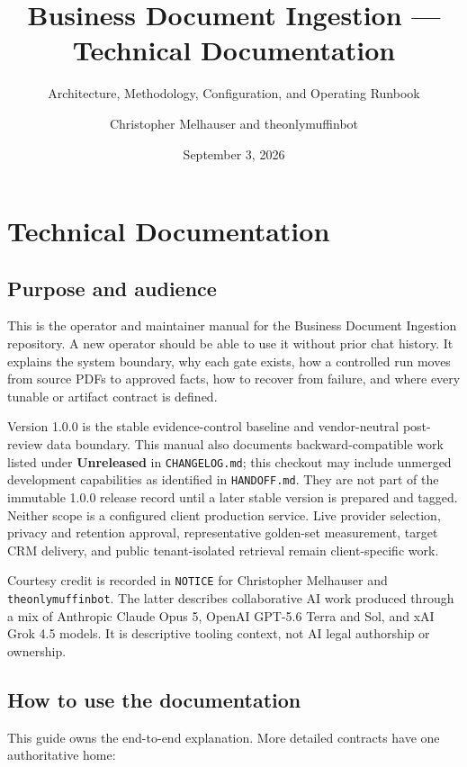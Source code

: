 \documentclass[
]{article}
\title{Business Document Ingestion --- Technical Documentation}
\subtitle{Architecture, Methodology, Configuration, and Operating
Runbook}
\author{Christopher Melhauser and theonlymuffinbot}
\date{September 3, 2026}
\begin{document}
\maketitle

\section{Technical Documentation}\label{technical-documentation}

\subsection{Purpose and audience}\label{purpose-and-audience}

This is the operator and maintainer manual for the Business Document
Ingestion repository. A new operator should be able to use it without
prior chat history. It explains the system boundary, why each gate
exists, how a controlled run moves from source PDFs to approved facts,
how to recover from failure, and where every tunable or artifact
contract is defined.

Version 1.0.0 is the stable evidence-control baseline and vendor-neutral
post-review data boundary. This manual also documents
backward-compatible work listed under \textbf{Unreleased} in
\texttt{CHANGELOG.md}; this checkout may include unmerged development
capabilities as identified in \texttt{HANDOFF.md}. They are not part of
the immutable 1.0.0 release record until a later stable version is
prepared and tagged. Neither scope is a configured client production
service. Live provider selection, privacy and retention approval,
representative golden-set measurement, target CRM delivery, and public
tenant-isolated retrieval remain client-specific work.

Courtesy credit is recorded in \texttt{NOTICE} for Christopher Melhauser
and \texttt{theonlymuffinbot}. The latter describes collaborative AI
work produced through a mix of Anthropic Claude Opus 5, OpenAI GPT-5.6
Terra and Sol, and xAI Grok 4.5 models. It is descriptive tooling
context, not AI legal authorship or ownership.

\subsection{How to use the
documentation}\label{how-to-use-the-documentation}

This guide owns the end-to-end explanation. More detailed contracts have
one authoritative home:
\end{document}
